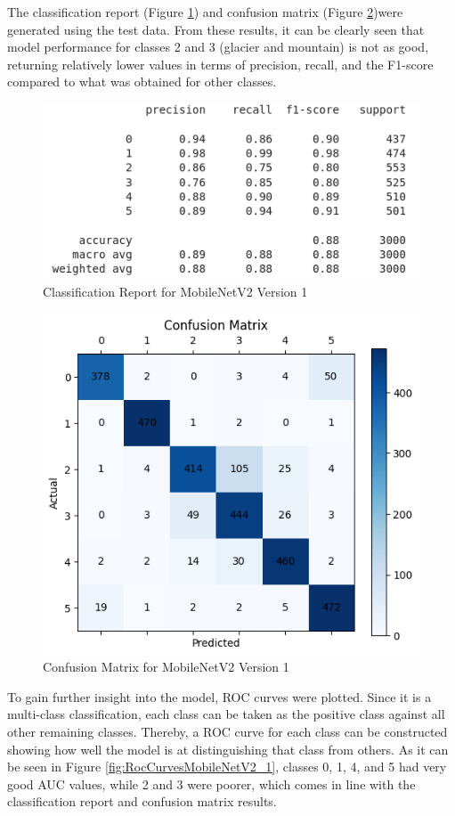 \documentclass[conference]{IEEEtran}
\begin{document}
The classification report (Figure \ref{fig:crMobileNetV2_1}) and confusion matrix (Figure \ref{fig:cmMobileNetV2_1})were generated using the test data. From these results, it can be clearly seen that model performance for classes 2 and 3 (glacier and mountain) is not as good, returning relatively lower values in terms of precision, recall, and the F1-score compared to what was obtained for other classes.

\begin{figure}[H]
    \centering
    \includegraphics[width=0.7\linewidth]{images/classReportMobileNetV2_1.png}
    \caption{Classification Report for MobileNetV2 Version 1}
    \label{fig:crMobileNetV2_1}
\end{figure}

\begin{figure}[H]
    \centering
    \includegraphics[width=0.7\linewidth]{images/confMatrixMobileNetV2_1.png}
    \caption{Confusion Matrix for MobileNetV2 Version 1}
    \label{fig:cmMobileNetV2_1}
\end{figure}

To gain further insight into the model, ROC curves were plotted. Since it is a multi-class classification, each class can be taken as the positive class against all other remaining classes. Thereby, a ROC curve for each class can be constructed showing how well the model is at distinguishing that class from others. As it can be seen in Figure \ref{fig:RocCurvesMobileNetV2_1}, classes 0, 1, 4, and 5 had very good AUC values, while 2 and 3 were poorer, which comes in line with the classification report and confusion matrix results.
\end{document}
